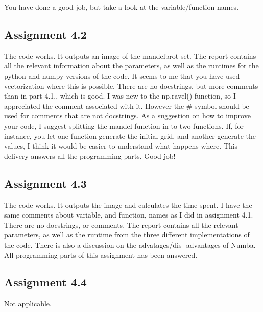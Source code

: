 \documentclass[a4paper]{article}
\begin{document}
    You have done a good job, but take a look at the variable/function
    names.
    
    \subsection*{Assignment 4.2} \label{sec:assignment5.2}
    The code works. It outputs an image of the mandelbrot set. The report 
    contains all the relevant information about the parameters, as 
    well as the runtimes for the python and numpy versions of the 
    code. It seems to me that you have used vectorization where
    this is possible. There are no docstrings, but more comments 
    than in part 4.1., which is good. I was new to the np.ravel() 
    function, so I appreciated the comment associated with it. However
    the \# symbol should be used for comments that are not docstrings.
    As a suggestion on how to improve your code, I suggest splitting
    the mandel function in to two functions. If, for instance, you 
    let one function generate the initial grid, and another generate 
    the values, I think it would be easier to understand what happens
    where. This delivery answers all the programming parts. Good job!


    
    
    \subsection*{Assignment 4.3}
    The code works. It outputs the image and calculates the time 
    spent. I have the same comments about variable, and function,
    names as I did in assignment 4.1. There are no docstrings, 
    or comments. The report contains all the relevant parameters, as
    well as the runtime from the three different implementations 
    of the code. There is also a discussion on the advatages/dis-
    advantages of Numba. All programming parts of this assignment
    has been answered. 
    
    \subsection*{Assignment 4.4}
    Not applicable.
    
\end{document}
